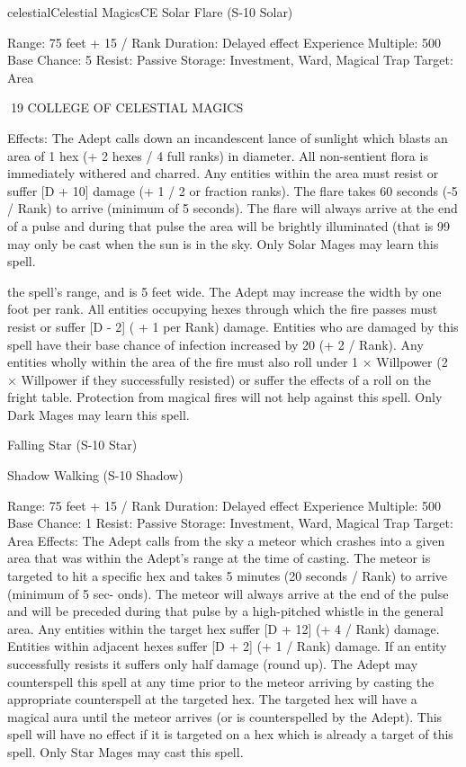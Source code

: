 \begin{College}[1.3]{celestial}{Celestial Magics}{CE}
Solar Flare (S-10 Solar) 

Range: 75 feet + 15 / Rank 
Duration: Delayed effect 
Experience Multiple: 500 
Base Chance: 5%
Resist: Passive 
Storage: Investment, Ward, Magical Trap 
Target: Area 

19 COLLEGE OF CELESTIAL MAGICS 

Effects:  The  Adept  calls  down  an  incandescent 
lance of sunlight which blasts an area of 1 hex (+ 2 
hexes  /  4  full  ranks)  in  diameter.  All  non-sentient 
flora  is  immediately  withered  and  charred.  Any 
entities  within  the  area  must  resist  or  suffer  [D  + 
10]  damage  (+  1  /  2  or  fraction  ranks).  The  flare 
takes 60 seconds (-5 / Rank) to arrive (minimum of 
5 seconds). The flare  will always arrive at the end 
of  a  pulse  and  during  that  pulse  the  area  will  be 
brightly illuminated (that is 99%
may only be cast when the sun is in the sky. Only 
Solar Mages may learn this spell. 

the  spell’s  range,  and  is  5  feet  wide.  The  Adept 
may  increase  the  width  by  one  foot  per  rank.  All 
entities  occupying  hexes  through  which  the  fire 
passes must resist or suffer [D - 2] ( + 1 per Rank) 
damage.  Entities  who  are  damaged  by  this  spell 
have their base chance of infection increased by 20 
(+ 2 / Rank). Any entities wholly within the area of 
the  fire  must  also  roll  under  1  ×  Willpower  (2  × 
Willpower  if  they  successfully  resisted)  or  suffer 
the  effects  of  a  roll  on  the  fright  table.  Protection 
from magical  fires  will  not  help  against  this  spell. 
Only Dark Mages may learn this spell. 

Falling Star (S-10 Star) 

Shadow Walking (S-10 Shadow) 

Range: 75 feet + 15 / Rank 
Duration: Delayed effect 
Experience Multiple: 500 
Base Chance: 1%
Resist: Passive 
Storage: Investment, Ward, Magical Trap 
Target: Area 
Effects:  The  Adept  calls  from  the  sky  a  meteor 
which crashes into a given area that was within the 
Adept’s range at the time of casting. The meteor is 
targeted  to  hit  a  specific  hex  and  takes  5  minutes 
(20  seconds  /  Rank)  to  arrive  (minimum  of  5  sec-
onds). The meteor  will always arrive at the end of 
the pulse and will be preceded during that pulse by 
a  high-pitched  whistle  in  the  general  area.  Any 
entities within the target hex suffer [D + 12] (+ 4 / 
Rank)  damage.  Entities  within  adjacent  hexes 
suffer  [D  +  2]  (+  1  /  Rank)  damage.  If  an  entity 
successfully  resists  it  suffers  only  half  damage 
(round  up).  The  Adept  may  counterspell  this  spell 
at any time prior to the meteor arriving by casting 
the  appropriate  counterspell  at  the  targeted  hex. 
The targeted hex will have a magical aura until the 
meteor arrives (or is counterspelled by the Adept). 
This  spell  will  have  no  effect  if  it is targeted  on  a 
hex  which  is  already  a  target  of  this  spell.  Only 
Star Mages may cast this spell. 


\end{College}
